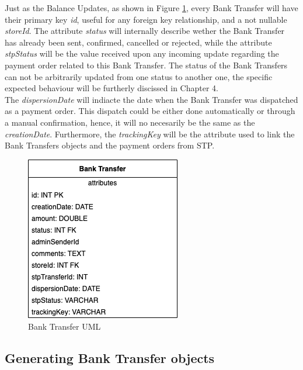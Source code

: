 Just as the Balance Updates, as shown in Figure \ref{fig:uml_bank_transfers}, every Bank Transfer will have their primary key \textit{id}, useful for any foreign key relationship, and a not nullable \textit{storeId}. The attribute \textit{status} will internally describe wether the Bank Transfer has already been sent, confirmed, cancelled or rejected, while the attribute \textit{stpStatus} will be the value received upon any incoming update regarding the payment order related to this Bank Transfer. The status of the Bank Transfers can not be arbitrarily updated from one status to another one, the specific expected behaviour will be furtherly discissed in Chapter 4.\\ 

The \textit{dispersionDate} will indiacte the date when the Bank Transfer was dispatched as a payment order. This dispatch could be either done automatically or through a manual confirmation, hence, it will no necesarily be the same as the \textit{creationDate}. Furthermore, the \textit{trackingKey} will be the attribute used to link the Bank Transfers objects and the payment orders from STP.

\begin{figure} [H]
    \centering
    \includegraphics[scale = 0.7]{assets/uml/BankTransfers.png}
    \caption{Bank Transfer UML}\label{fig:uml_bank_transfers}
\end{figure}

\subsection{Generating Bank Transfer objects}

